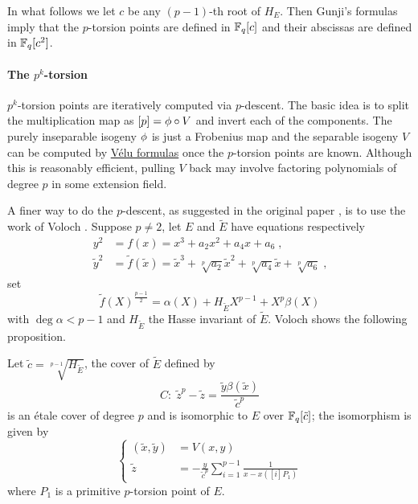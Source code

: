 In what follows we let $c$ be any $(p-1)$-th root of $H_E$. Then
Gunji's formulas imply that the $p$-torsion points are defined in
$\mathbb{F}_q[c]$ and their abscissas are defined in $\mathbb{F}_q[c^2]$.


\paragraph{The $p^k$-torsion}
$p^k$-torsion points are iteratively computed via $p$-descent. The
basic idea is to split the multiplication map as $[p] = \phi\circ
V$ and invert each of the components. The purely inseparable isogeny
$\phi$ is just a Frobenius map and the separable isogeny $V$ can
be computed by \hyperref[sec:velu-formulas]{Vélu formulas} once the
$p$-torsion points are known. Although this is reasonably efficient,
pulling $V$ back may involve factoring polynomials of degree $p$ in
some extension field.

A finer way to do the $p$-descent, as suggested in the original paper
\cite{couveignes96}, is to use the work of Voloch
\cite{voloch90}. Suppose $p\ne2$, let $E$ and $\widetilde{E}$ have
equations respectively
\begin{align*}
  y^2&=f(x)=x^3+a_2x^2+a_4x+a_6 \;\text{,}\\
  \tilde{y}^2&=\tilde{f}(\tilde{x}) = \tilde{x}^3 +
  \sqrt[p]{a_2}\tilde{x}^2 + \sqrt[p]{a_4}\tilde{x} + \sqrt[p]{a_6}
  \;\text{,}
\end{align*}
set
 \begin{equation}
  \label{eq:voloch:cover}
  \tilde{f}(X)^{\frac{p-1}{2}} = \alpha(X) + H_{\widetilde{E}}X^{p-1} + X^p\beta(X)
\end{equation}
with $\deg \alpha < p-1$ and $H_{\widetilde{E}}$ the Hasse invariant
of $\widetilde{E}$. Voloch shows the following proposition.

\begin{proposition}
  \label{th:voloch}
  Let $\tilde{c} = \sqrt[p-1]{H_{\widetilde{E}}}$, the cover of
  $\widetilde{E}$ defined by
  \begin{equation}
    \label{th:voloch:cover}
    C:\; \tilde{z}^p - \tilde{z} = \frac{\tilde{y}\beta(\tilde{x})}{\tilde{c}^p}
  \end{equation}
   is an étale cover of degree $p$ and is isomorphic to
  $E$ over $\mathbb{F}_q[\tilde{c}]$; the isomorphism is given by
  \begin{equation}
    \label{th:voloch:isom}
    \left\{
      \begin{aligned}
        (\tilde{x}, \tilde{y}) &= V(x, y)\\
        \tilde{z} &= -\frac{y}{\tilde{c}^p}\sum_{i=1}^{p-1}\frac{1}{x - x([i]P_1)}
      \end{aligned}
    \right.
  \end{equation}
  where $P_1$ is a primitive $p$-torsion point of $E$.
\end{proposition}

